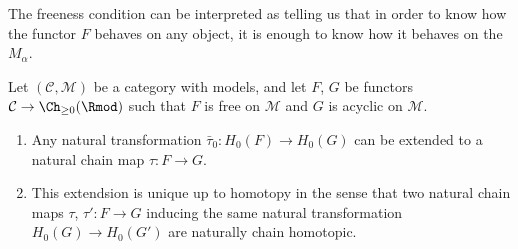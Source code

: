 \documentclass[main.tex]{subfiles}
\begin{document}
The freeness condition can be interpreted as telling us that in order to know how the functor $F$ behaves on any object, it is enough to know how it behaves on the $M_{\alpha}$.

\begin{theorem}
  \label{thm:acyclic_model_theorem}
  Let $(\mathcal{C}, \mathcal{M})$ be a category with models, and let $F$, $G$ be functors $\mathcal{C} \to \Ch_{\geq 0}(\Rmod)$ such that $F$ is free on $\mathcal{M}$ and $G$ is acyclic on $\mathcal{M}$.
  \begin{enumerate}
    \item Any natural transformation $\bar{\tau}_{0}\colon H_{0}(F) \to H_{0}(G)$ can be extended to a natural chain map $\tau\colon F \to G$.

    \item This extendsion is unique up to homotopy in the sense that two natural chain maps $\tau$, $\tau'\colon F \to G$ inducing the same natural transformation $H_{0}(G) \to H_{0}(G')$ are naturally chain homotopic.
  \end{enumerate}
\end{theorem}
\end{document}
